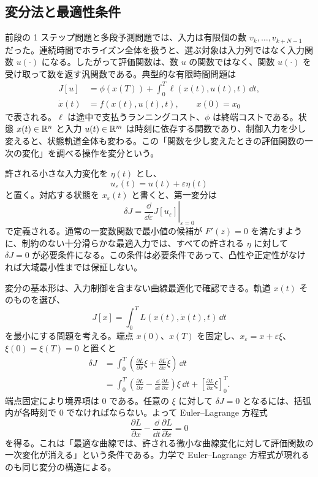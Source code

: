 \subsection{変分法と最適性条件}

前段の 1 ステップ問題と多段予測問題では、入力は有限個の数 $v_k,\ldots,v_{k+N-1}$ だった。連続時間でホライズン全体を扱うと、選ぶ対象は入力列ではなく入力関数 $u(\cdot)$ になる。したがって評価関数は、数 $u$ の関数ではなく、関数 $u(\cdot)$ を受け取って数を返す汎関数である。典型的な有限時間問題は
\begin{align}
  J[u]
  &=
  \phi(x(T))
  +\int_0^T \ell(x(t),u(t),t)\,\dd t,\\
  \dot{x}(t)&=f(x(t),u(t),t),
  \qquad x(0)=x_0
  \label{eq:oc-general-problem}
\end{align}
で表される。$\ell$ は途中で支払うランニングコスト、$\phi$ は終端コストである。状態 $x(t)\in\mathbb{R}^n$ と入力 $u(t)\in\mathbb{R}^m$ は時刻に依存する関数であり、制御入力を少し変えると、状態軌道全体も変わる。この「関数を少し変えたときの評価関数の一次の変化」を調べる操作を変分という。

許される小さな入力変化を $\eta(t)$ とし、
\begin{equation}
  u_\varepsilon(t)=u(t)+\varepsilon \eta(t)
\end{equation}
と置く。対応する状態を $x_\varepsilon(t)$ と書くと、第一変分は
\begin{equation}
  \delta J
  =
  \left.\frac{\dd}{\dd\varepsilon}J[u_\varepsilon]\right|_{\varepsilon=0}
  \label{eq:first-variation}
\end{equation}
で定義される。通常の一変数関数で最小値の候補が $F'(z)=0$ を満たすように、制約のない十分滑らかな最適入力では、すべての許される $\eta$ に対して $\delta J=0$ が必要条件になる。この条件は必要条件であって、凸性や正定性がなければ大域最小性までは保証しない。

変分の基本形は、入力制御を含まない曲線最適化で確認できる。軌道 $x(t)$ そのものを選び、
\begin{equation}
  J[x]=\int_0^T L(x(t),\dot{x}(t),t)\,\dd t
\end{equation}
を最小にする問題を考える。端点 $x(0)$、$x(T)$ を固定し、$x_\varepsilon=x+\varepsilon \xi$、$\xi(0)=\xi(T)=0$ と置くと
\begin{align}
  \delta J
  &=
  \int_0^T
  \left(
    \frac{\partial L}{\partial x}\xi
    +\frac{\partial L}{\partial \dot{x}}\dot{\xi}
  \right)\,\dd t\\
  &=
  \int_0^T
  \left(
    \frac{\partial L}{\partial x}
    -\frac{\dd}{\dd t}\frac{\partial L}{\partial \dot{x}}
  \right)\xi\,\dd t
  +
  \left[
    \frac{\partial L}{\partial \dot{x}}\xi
  \right]_0^T.
\end{align}
端点固定により境界項は 0 である。任意の $\xi$ に対して $\delta J=0$ となるには、括弧内が各時刻で 0 でなければならない。よって Euler--Lagrange 方程式
\begin{equation}
  \frac{\partial L}{\partial x}
  -\frac{\dd}{\dd t}
  \frac{\partial L}{\partial \dot{x}}
  =0
  \label{eq:euler-lagrange-entry}
\end{equation}
を得る。これは「最適な曲線では、許される微小な曲線変化に対して評価関数の一次変化が消える」という条件である。力学で Euler--Lagrange 方程式が現れるのも同じ変分の構造による。

